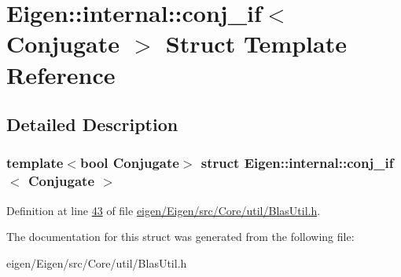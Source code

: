 \hypertarget{struct_eigen_1_1internal_1_1conj__if}{}\section{Eigen\+:\+:internal\+:\+:conj\+\_\+if$<$ Conjugate $>$ Struct Template Reference}
\label{struct_eigen_1_1internal_1_1conj__if}


\subsection{Detailed Description}
\subsubsection*{template$<$bool Conjugate$>$\newline
struct Eigen\+::internal\+::conj\+\_\+if$<$ Conjugate $>$}



Definition at line \hyperlink{eigen_2_eigen_2src_2_core_2util_2_blas_util_8h_source_l00043}{43} of file \hyperlink{eigen_2_eigen_2src_2_core_2util_2_blas_util_8h_source}{eigen/\+Eigen/src/\+Core/util/\+Blas\+Util.\+h}.



The documentation for this struct was generated from the following file\+:\begin{DoxyCompactItemize}
\item 
eigen/\+Eigen/src/\+Core/util/\+Blas\+Util.\+h\end{DoxyCompactItemize}
